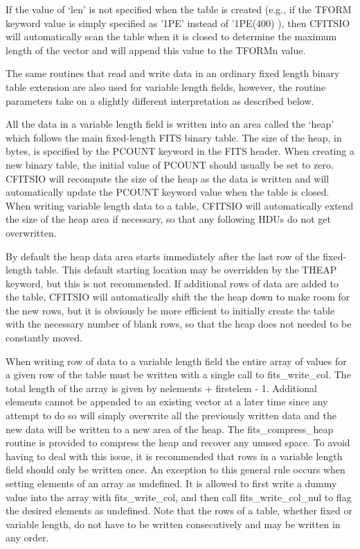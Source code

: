 \documentclass[11pt]{book}
\begin{document}
If the value
of `len' is not specified when the table is created (e.g., if the TFORM
keyword value is simply specified as '1PE' instead of '1PE(400) ), then
CFITSIO will automatically scan the table when it is closed to
determine the maximum length of the vector and will append this value
to the TFORMn value.

The same routines that read and write data in an ordinary fixed length
binary table extension are also used for variable length fields,
however, the routine parameters take on a slightly different
interpretation as described below.

All the data in a variable length field is written into an area called
the `heap' which follows the main fixed-length FITS binary table. The
size of the heap, in bytes, is specified by the PCOUNT keyword in the
FITS header. When creating a new binary table, the initial value of
PCOUNT should usually be set to zero. CFITSIO will recompute the size
of the heap as the data is written and will automatically update the
PCOUNT keyword value when the table is closed.  When writing variable
length data to a table, CFITSIO will automatically extend the size
of the heap area if necessary, so that any following HDUs do not
get overwritten.

By default the heap data area starts immediately after the last row of
the fixed-length table.  This default starting location may be
overridden by the THEAP keyword, but this is not recommended.
If additional rows of data are added to the table, CFITSIO will
automatically shift the the heap down to make room for the new
rows, but it is obviously be more efficient to initially
create the table with the necessary number of blank rows, so that
the heap does not needed to be constantly moved.

When writing row of data to a variable length field the entire array of values for
a given row of the table must be written with a single call to
fits\_write\_col.
The total length of the array is given by nelements
+ firstelem - 1.  Additional elements cannot be appended to an existing
vector at a later time since any attempt to do so will simply overwrite
all the previously written data and the new data will be
written to a new area of the heap.  The fits\_compress\_heap routine
is provided to compress the heap and recover any unused space.
To avoid having to deal with this issue, it is recommended
that rows in a variable length field should only be written once.
An exception to
this general rule occurs when setting elements of an array as
undefined.  It is allowed to first write a dummy value into the array with
fits\_write\_col, and then call fits\_write\_col\_nul to flag the
desired elements as undefined. Note that the rows of a table,
whether fixed or variable length, do not have to be written
consecutively and may be written in any order.
\end{document}
